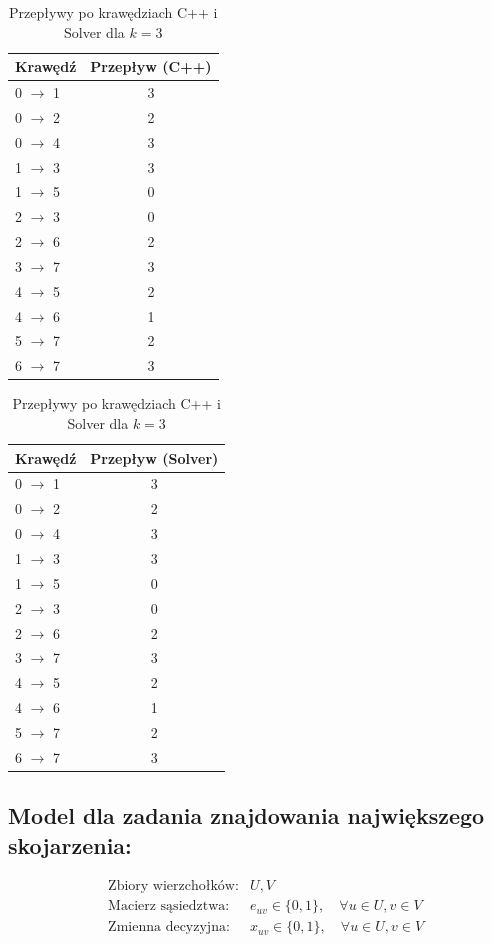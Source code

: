 \documentclass{article}
\begin{document}
\begin{table}[h]
\centering
\caption{Przepływy po krawędziach C++ i Solver dla $k=3$}
\begin{minipage}{0.45\textwidth}
\centering
\begin{tabular}{|l|c|}
\hline
Krawędź                   & Przepływ (C++) \\
\hline
0 $\to$ 1 & 3\\
0 $\to$ 2& 2\\
0 $\to$ 4& 3\\
1 $\to$ 3& 3\\
1 $\to$ 5& 0\\
2 $\to$ 3& 0\\
2 $\to$ 6& 2\\
3 $\to$ 7& 3\\
4 $\to$ 5& 2\\
4 $\to$ 6& 1\\
5 $\to$ 7& 2\\
6 $\to$ 7& 3\\
\hline
\end{tabular}
\end{minipage}
\hfill
\begin{minipage}{0.45\textwidth}
\centering
\begin{tabular}{|l|c|}
\hline
Krawędź                   & Przepływ (Solver) \\
\hline
0 $\to$ 1 & 3\\
0 $\to$ 2& 2\\
0 $\to$ 4& 3\\
1 $\to$ 3& 3\\
1 $\to$ 5& 0\\
2 $\to$ 3& 0\\
2 $\to$ 6& 2\\
3 $\to$ 7& 3\\
4 $\to$ 5& 2\\
4 $\to$ 6& 1\\
5 $\to$ 7& 2\\
6 $\to$ 7& 3\\
\hline
\end{tabular}
\end{minipage}
\end{table}

\subsection*{Model dla zadania znajdowania największego skojarzenia:}
\begin{align*}
    &\text{Zbiory wierzchołków:} & U, V \\
    &\text{Macierz sąsiedztwa:} & e_{uv} \in \{0, 1\}, \quad \forall u \in U, v \in V \\
    &\text{Zmienna decyzyjna:} & x_{uv} \in \{0, 1\}, \quad \forall u \in U, v \in V \\
\end{align*}
\end{document}
